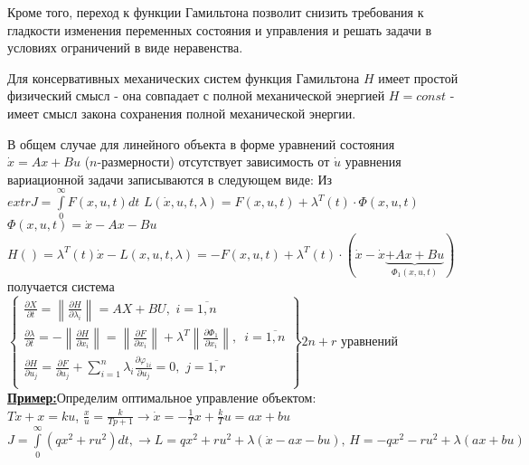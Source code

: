 \documentclass[preprint,russian,a5paper,10pt,twoside,mediummath]{ncc}
\newcommand{\ExampleMy}{\textbf{\underline{Пример:}}}
\begin{document}
\par Кроме того, переход к функции Гамильтона позволит снизить требования к гладкости изменения переменных состояния и управления и решать задачи в условиях ограничений в виде неравенства.
\par Для консервативных механических систем функция Гамильтона $H$ имеет простой физический смысл - она совпадает с полной механической энергией $H=const$ - имеет смысл закона сохранения полной механической энергии.
\par В общем случае для линейного объекта в форме уравнений состояния $\dot{x}=Ax+Bu$ ($n$-размерности) отсутствует зависимость от $\dot{u}$ уравнения вариационной задачи записываются в следующем виде:
Из $extrJ=\int\limits_{0}^{\infty }{F\left( x,u,t \right)dt}$
$L\left( \dot{x},u,t,\lambda  \right)=F\left( x,u,t \right)+{{\lambda }^{T}}\left( t \right)\cdot \Phi \left( x,u,t \right)$ $\Phi \left( x,u,t \right)=\dot{x}-Ax-Bu$
\\$H\left( {} \right)={{\lambda }^{T}}\left( t \right)\dot{x}-L\left( x,u,t,\lambda  \right)=-F\left( x,u,t \right)+{{\lambda }^{T}}\left( t \right)\cdot \left( \dot{x}-\dot{x}\underbrace{+Ax+Bu}_{{{\Phi }_{1}}\left( x,u,t \right)} \right)$
получается система 
\\$\left\{ \left. \begin{array}{*{35}{l}}
   \frac{\partial X}{\partial t}=\left\| \frac{\partial H}{\partial {{\lambda }_{i}}} \right\|=AX+BU,\,\,i=\overline{1,n}  \\
   \frac{\partial \lambda }{\partial t}=-\left\| \frac{\partial H}{\partial {{x}_{i}}} \right\|=\left\| \frac{\partial F}{\partial {{x}_{i}}} \right\|+{{\lambda }^{T}}\left\| \frac{\partial {{\Phi }_{1}}}{\partial {{x}_{i}}} \right\|,\,\,\,i=\overline{1,n}  \\
   \frac{\partial H}{\partial {{u}_{j}}}=\frac{\partial F}{\partial {{u}_{j}}}+\sum\limits_{i=1}^{n}{{{\lambda }_{i}}\frac{\partial {{\varphi }_{1i}}}{\partial {{u}_{j}}}}=0,\,\,j=\overline{1,r}  \\
\end{array} \right\} \right.2n+r$ уравнений
\\
\ExampleMy Определим оптимальное управление объектом:
\\$T\dot{x}+x=ku$, $\frac{x}{u}=\frac{k}{Tp+1}\to \dot{x}=-\frac{1}{T}x+\frac{k}{T}u=ax+bu$
\\$J=\int\limits_{0}^{\infty }{\left( q{{x}^{2}}+r{{u}^{2}} \right)}dt,\to L=q{{x}^{2}}+r{{u}^{2}}+\lambda \left( \dot{x}-ax-bu \right),\,H=-q{{x}^{2}}-r{{u}^{2}}+\lambda \left( ax+bu \right)$
\end{document}
